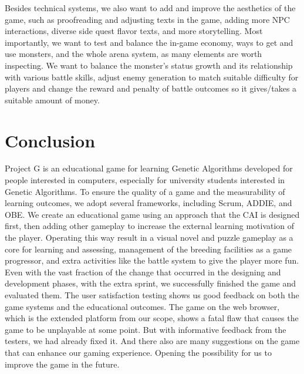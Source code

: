 \documentclass[12pt,oneside,openright,a4paper]{cpe-english-project}
\begin{document}
	Besides technical systems, we also want to add and improve the aesthetics of the game, such as proofreading and adjusting texts in the game, adding more NPC interactions, diverse side quest flavor texts, and more storytelling. Most importantly, we want to test and balance the in-game economy, ways to get and use monsters, and the whole arena system, as many elements are worth inspecting. We want to balance the monster's status growth and its relationship with various battle skills, adjust enemy generation to match suitable difficulty for players and change the reward and penalty of battle outcomes so it gives/takes a suitable amount of money.

\section{Conclusion}
Project G is an educational game for learning Genetic Algorithms developed for people interested in computers, especially for university students interested in Genetic Algorithms. To ensure the quality of a game and the measurability of learning outcomes, we adopt several frameworks, including Scrum, ADDIE, and OBE. We create an educational game using an approach that the CAI is designed first, then adding other gameplay to increase the external learning motivation of the player. Operating this way result in a visual novel and puzzle gameplay as a core for learning and assessing, management of the breeding facilities as a game progressor, and extra activities like the battle system to give the player more fun. \\
Even with the vast fraction of the change that occurred in the designing and development phases, with the extra sprint, we successfully finished the game and evaluated them. The user satisfaction testing shows us good feedback on both the game systems and the educational outcomes. The game on the web browser, which is the extended platform from our scope, shows a fatal flaw that causes the game to be unplayable at some point. But with informative feedback from the testers, we had already fixed it. And there also are many suggestions on the game that can enhance our gaming experience. Opening the possibility for us to improve the game in the future.

\end{document}
